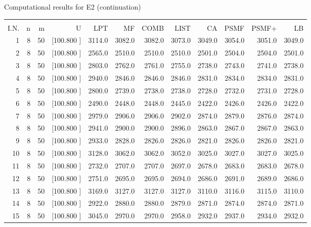 \documentclass[12pt,a4paper]{article}
\begin{document}
\begin{center}
 Computational results for E2 (continuation) {\tiny
\begin{tabular}{r r r r r r r r r r r r}\hline
    &   &   &          &        &        &        &        &        &        &        &       \\[-0.1in]
  I.N.  &  n  &  m  &  U  &  LPT  &  MF  &  COMB  &  LIST  &  CA  & PSMF &PSMF+ & LB \\[0.03in]
\hline
   1&  8& 50&[100.800   ]&  3114.0&  3082.0&  3082.0&  3073.0&  3049.0&  3054.0&  3051.0&  3049.0\\[-0.02in]
   2&  8& 50&[100.800   ]&  2565.0&  2510.0&  2510.0&  2510.0&  2501.0&  2504.0&  2504.0&  2501.0\\[-0.02in]
   3&  8& 50&[100.800   ]&  2803.0&  2762.0&  2761.0&  2755.0&  2738.0&  2743.0&  2741.0&  2738.0\\[-0.02in]
   4&  8& 50&[100.800   ]&  2940.0&  2846.0&  2846.0&  2846.0&  2831.0&  2834.0&  2834.0&  2831.0\\[-0.02in]
   5&  8& 50&[100.800   ]&  2800.0&  2739.0&  2738.0&  2738.0&  2728.0&  2732.0&  2731.0&  2728.0\\[-0.02in]
   6&  8& 50&[100.800   ]&  2490.0&  2448.0&  2448.0&  2445.0&  2422.0&  2426.0&  2426.0&  2422.0\\[-0.02in]
   7&  8& 50&[100.800   ]&  2979.0&  2906.0&  2906.0&  2902.0&  2874.0&  2879.0&  2876.0&  2874.0\\[-0.02in]
   8&  8& 50&[100.800   ]&  2941.0&  2900.0&  2900.0&  2896.0&  2863.0&  2867.0&  2867.0&  2863.0\\[-0.02in]
   9&  8& 50&[100.800   ]&  2933.0&  2828.0&  2826.0&  2826.0&  2821.0&  2826.0&  2826.0&  2821.0\\[-0.02in]
  10&  8& 50&[100.800   ]&  3128.0&  3062.0&  3062.0&  3052.0&  3025.0&  3027.0&  3027.0&  3025.0\\[-0.02in]
  11&  8& 50&[100.800   ]&  2732.0&  2707.0&  2707.0&  2697.0&  2678.0&  2683.0&  2683.0&  2678.0\\[-0.02in]
  12&  8& 50&[100.800   ]&  2751.0&  2695.0&  2695.0&  2694.0&  2686.0&  2691.0&  2689.0&  2686.0\\[-0.02in]
  13&  8& 50&[100.800   ]&  3169.0&  3127.0&  3127.0&  3127.0&  3110.0&  3116.0&  3115.0&  3110.0\\[-0.02in]
  14&  8& 50&[100.800   ]&  2922.0&  2880.0&  2880.0&  2879.0&  2871.0&  2874.0&  2874.0&  2871.0\\[-0.02in]
  15&  8& 50&[100.800   ]&  3045.0&  2970.0&  2970.0&  2958.0&  2932.0&  2937.0&  2934.0&  2932.0\\[-0.02in]

\end{tabular}}
\end{center}
\end{document}
